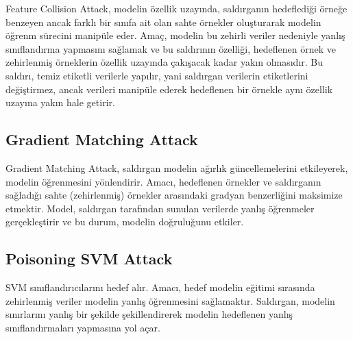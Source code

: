 Feature Collision Attack, modelin özellik uzayında, saldırganın hedeflediği örneğe benzeyen ancak farklı bir sınıfa ait olan sahte örnekler oluşturarak modelin öğrenm sürecini manipüle eder. Amaç, modelin bu zehirli veriler nedeniyle yanlış sınıflandırma yapmasını sağlamak ve bu saldırının özelliği, hedeflenen örnek ve zehirlenmiş örneklerin özellik uzayında çakışacak kadar yakın olmasıdır. Bu saldırı, temiz etiketli verilerle yapılır, yani saldırgan verilerin etiketlerini değiştirmez, ancak verileri manipüle ederek hedeflenen bir örnekle aynı özellik uzayına yakın hale getirir.

\newpage

\subsection{Gradient Matching Attack}

Gradient Matching Attack, saldırgan modelin ağırlık güncellemelerini etkileyerek, modelin öğrenmesini yönlendirir. Amacı, hedeflenen örnekler ve saldırganın sağladığı sahte (zehirlenmiş) örnekler arasındaki gradyan benzerliğini maksimize etmektir. Model, saldırgan tarafından sunulan verilerde yanlış öğrenmeler gerçekleştirir ve bu durum, modelin doğruluğunu etkiler.

\newpage

\subsection{Poisoning SVM Attack}

SVM sınıflandırıcılarını hedef alır. Amacı, hedef modelin eğitimi sırasında zehirlenmiş veriler modelin yanlış öğrenmesini sağlamaktır. Saldırgan, modelin sınırlarını yanlış bir şekilde şekillendirerek modelin hedeflenen yanlış sınıflandırmaları yapmasına yol açar. 

\newpage